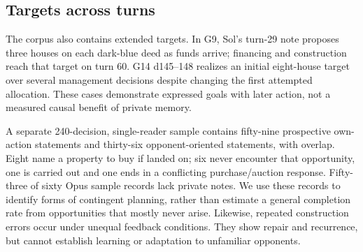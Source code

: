 \subsection{Targets across turns}

The corpus also contains extended targets. In G9, Sol's turn-29 note proposes three houses on each dark-blue deed as funds arrive; financing and construction reach that target on turn 60. G14 d145--148 realizes an initial eight-house target over several management decisions despite changing the first attempted allocation. These cases demonstrate expressed goals with later action, not a measured causal benefit of private memory.

A separate 240-decision, single-reader sample contains fifty-nine prospective own-action statements and thirty-six opponent-oriented statements, with overlap. Eight name a property to buy if landed on; six never encounter that opportunity, one is carried out and one ends in a conflicting purchase/auction response. Fifty-three of sixty Opus sample records lack private notes. We use these records to identify forms of contingent planning, rather than estimate a general completion rate from opportunities that mostly never arise. Likewise, repeated construction errors occur under unequal feedback conditions. They show repair and recurrence, but cannot establish learning or adaptation to unfamiliar opponents.
